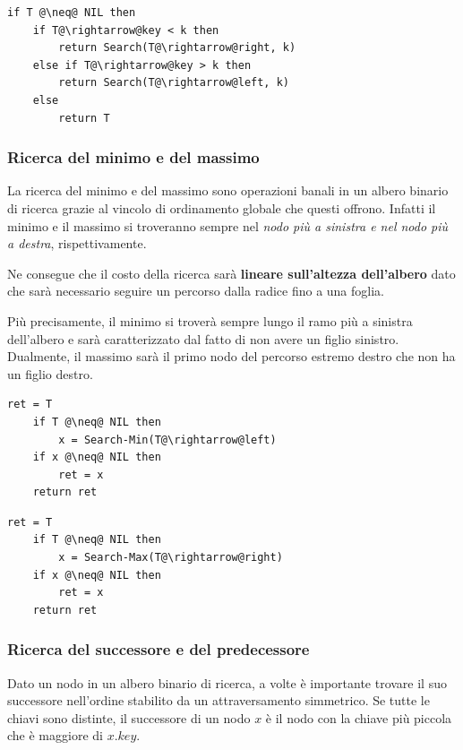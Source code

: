 \begin{lstlisting}[language=asd,caption={Search(T,k)},label=lst:search]
if T @\neq@ NIL then
	if T@\rightarrow@key < k then
  		return Search(T@\rightarrow@right, k)
	else if T@\rightarrow@key > k then
  		return Search(T@\rightarrow@left, k)
	else
  		return T
\end{lstlisting}

\subsubsection{Ricerca del minimo e del massimo}
La ricerca del minimo e del massimo sono operazioni banali in un albero binario di ricerca grazie al vincolo di ordinamento globale che questi offrono. Infatti il minimo e il massimo si troveranno sempre nel \textit{nodo più a sinistra e nel nodo più a destra}, rispettivamente.

Ne consegue che il costo della ricerca sarà \textbf{lineare sull'altezza dell'albero} dato che sarà necessario seguire un percorso dalla radice fino a una foglia.

Più precisamente, il minimo si troverà sempre lungo il ramo più a sinistra dell'albero e sarà caratterizzato dal fatto di non avere un figlio sinistro. Dualmente, il massimo sarà il primo nodo del percorso estremo destro che non ha un figlio destro.

\begin{center}
\begin{minipage}{.45\textwidth}

\begin{lstlisting}[language=asd,caption={Search-Min(T)},label=lst:search_min]
	ret = T
	if T @\neq@ NIL then
		x = Search-Min(T@\rightarrow@left)
	if x @\neq@ NIL then
		ret = x
	return ret
\end{lstlisting}
\end{minipage}
\begin{minipage}{.45\textwidth}
	\begin{lstlisting}[language=asd,caption={Search-Max(T)},label=lst:search_max]
	ret = T
	if T @\neq@ NIL then
		x = Search-Max(T@\rightarrow@right)
	if x @\neq@ NIL then
		ret = x
	return ret
\end{lstlisting}
\end{minipage}
\end{center}

\subsubsection{Ricerca del successore e del predecessore}
Dato un nodo in un albero binario di ricerca, a volte è importante trovare il suo successore nell'ordine stabilito da un attraversamento simmetrico. Se tutte le chiavi sono distinte, il successore di un nodo $x$ è il nodo con la chiave più piccola che è maggiore di $x.key$.

